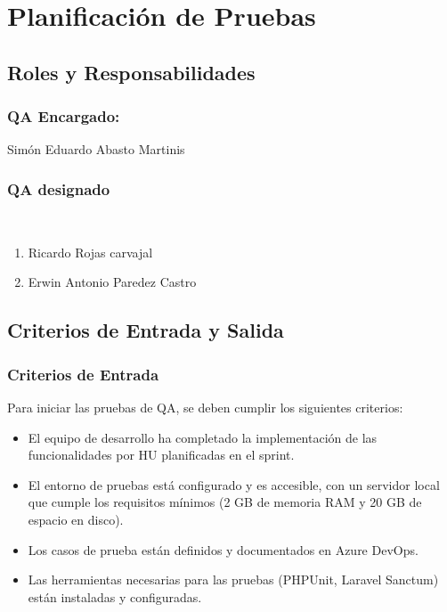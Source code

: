 \documentclass[12pt,letterpaper]{article}
\begin{document}
\section{Planificación de Pruebas}


    
    \subsection{Roles y Responsabilidades}
    \subsubsection{QA Encargado:}
    Simón Eduardo Abasto Martinis\\
    \subsubsection{QA designado}\\
    
    \begin{enumerate}
        \item Ricardo Rojas carvajal
        \item Erwin Antonio Paredez Castro
    \end{enumerate}
    
    
 
\subsection{Criterios de Entrada y Salida}
\subsubsection{Criterios de Entrada}
    Para iniciar las pruebas de QA, se deben cumplir los siguientes criterios:
    \begin{itemize}
    \item El equipo de desarrollo ha completado la implementación de las funcionalidades por HU planificadas en el sprint.
    \item El entorno de pruebas está configurado y es accesible, con un servidor local que cumple los requisitos mínimos (2 GB de memoria RAM y 20 GB de espacio en disco).
    \item Los casos de prueba están definidos y documentados en Azure DevOps.
    \item Las herramientas necesarias para las pruebas (PHPUnit, Laravel Sanctum) están instaladas y configuradas.
    \end{itemize}
\end{document}
